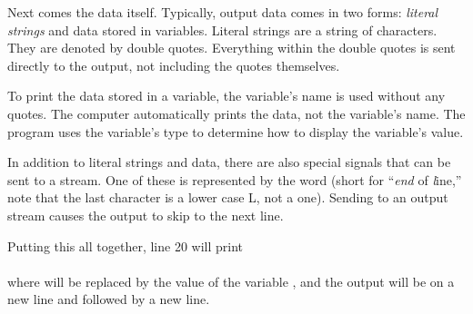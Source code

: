 Next comes the data itself.  Typically, output data comes in two forms: \emph{literal strings} and data stored in variables.   Literal strings are a string of characters.  They are denoted by double quotes.  Everything within the double quotes is sent directly to the output, not including the quotes themselves.

To print the data stored in a variable, the variable's name is used without any quotes.  The computer automatically prints the data, not the variable's name.  The program uses the variable's type to determine how to display the variable's value.  

In addition to literal strings and data, there are also special signals that can be sent to a stream.  One of these is represented by the word  (short for ``\emph{end} of \emph{l}ine,'' note that the last character is a lower case L, not a one).  Sending  to an output stream causes the output to skip to the next line.  

Putting this all together, line 20 will print\\
\\
where  will be replaced by the value of the variable , and 
the output will be on a new line and followed by a new line.  


